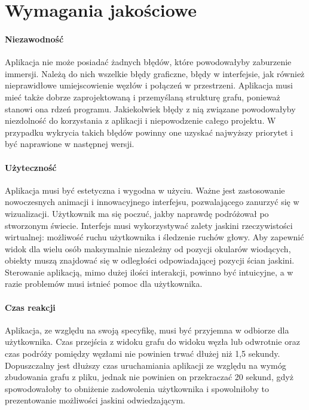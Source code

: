 \section{Wymagania jakościowe}
\label{sec:wymagania-jakosciowe}

\paragraph{Niezawodność}
Aplikacja nie może posiadać żadnych błędów, które powodowałyby zaburzenie immersji. Należą do nich wszelkie błędy graficzne, błędy w interfejsie, jak również nieprawidłowe umiejscowienie węzłów i połączeń w przestrzeni. Aplikacja musi mieć także dobrze zaprojektowaną i przemyślaną strukturę grafu, ponieważ stanowi ona rdzeń programu. Jakiekolwiek błędy z nią związane powodowałyby niezdolność do korzystania z aplikacji i niepowodzenie całego projektu. W przypadku wykrycia takich błędów powinny one uzyskać najwyższy priorytet i być naprawione w następnej wersji.

\paragraph{Użyteczność}
Aplikacja musi być estetyczna i wygodna w użyciu. Ważne jest zastosowanie nowoczesnych animacji i innowacyjnego interfejsu, pozwalającego zanurzyć się w wizualizacji. Użytkownik ma się poczuć, jakby naprawdę podróżował po stworzonym świecie. Interfejs musi wykorzystywać zalety jaskini rzeczywistości wirtualnej: możliwość ruchu użytkownika i śledzenie ruchów głowy. Aby zapewnić widok dla wielu osób maksymalnie niezależny od pozycji okularów wiodących, obiekty muszą znajdować się w odległości odpowiadającej pozycji ścian jaskini. Sterowanie aplikacją, mimo dużej ilości interakcji, powinno być intuicyjne, a w razie problemów musi istnieć pomoc dla użytkownika.

\paragraph{Czas reakcji}
Aplikacja, ze względu na swoją specyfikę, musi być przyjemna w odbiorze dla użytkownika. Czas przejścia z widoku grafu do widoku węzła lub odwrotnie oraz czas podróży pomiędzy węzłami nie powinien trwać dłużej niż 1,5 sekundy. Dopuszczalny jest dłuższy czas uruchamiania aplikacji ze względu na wymóg zbudowania grafu z pliku, jednak nie powinien on przekraczać 20 sekund, gdyż spowodowałoby to obniżenie zadowolenia użytkownika i spowolniłoby to prezentowanie możliwości jaskini odwiedzającym. 
